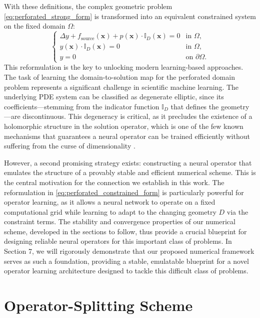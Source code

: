 \documentclass[pdflatex,sn-mathphys-num]{sn-jnl}%
\theoremstyle{thmstyleone}%
\numberwithin{equation}{section}
\newcommand{\indicator}[1]{\mathbb{I}_{#1}}
\begin{document}
With these definitions, the complex geometric problem \eqref{eq:perforated_strong_form} is transformed into an equivalent constrained system on the fixed domain $\Omega$:
\begin{equation}
\label{eq:perforated_constrained_form}
\begin{cases}
\Delta y + f_{\text{source}}(\bm{x}) + p(\bm{x}) \cdot \indicator{D}(\bm{x}) = 0 & \text{in } \Omega, \\
y(\bm{x}) \cdot \indicator{D}(\bm{x}) = 0 & \text{in } \Omega, \\
y = 0 & \text{on } \partial \Omega.
\end{cases}
\end{equation}
This reformulation is the key to unlocking modern learning-based approaches. The task of learning the domain-to-solution map for the perforated domain problem represents a significant challenge in scientific machine learning. The underlying PDE system can be classified as degenerate elliptic, since its coefficients---stemming from the indicator function $\indicator{D}$ that defines the geometry---are discontinuous. This degeneracy is critical, as it precludes the existence of a holomorphic structure in the solution operator, which is one of the few known mechanisms that guarantees a neural operator can be trained efficiently without suffering from the curse of dimensionality \cite{cohen2010convergence, lanthaler2022error}.

However, a second promising strategy exists: constructing a neural operator that emulates the structure of a provably stable and efficient numerical scheme. This is the central motivation for the connection we establish in this work. The reformulation in \eqref{eq:perforated_constrained_form} is particularly powerful for operator learning, as it allows a neural network to operate on a fixed computational grid while learning to adapt to the changing geometry $D$ via the constraint terms. The stability and convergence properties of our numerical scheme, developed in the sections to follow, thus provide a crucial blueprint for designing reliable neural operators for this important class of problems. In Section 7, we will rigorously demonstrate that our proposed numerical framework serves as such a foundation, providing a stable, emulatable blueprint for a novel operator learning architecture designed to tackle this difficult class of problems.




\section{Operator-Splitting Scheme}
\label{sec:operator_splitting}
\end{document}
